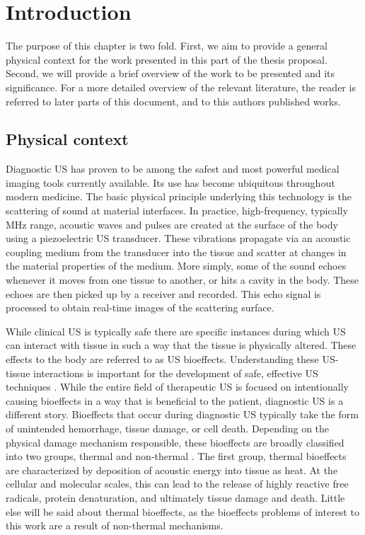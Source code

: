 \chapter{Introduction} \label{ch:usbe_intro}%
The purpose of this chapter is two fold. First, we aim to provide a
general physical context for the work presented in this part of the
thesis proposal. Second, we will provide a brief overview of the work
to be presented and its significance. For a more detailed overview of
the relevant literature, the reader is referred to later parts of this
document, and to this authors published works.

\section{Physical context} \label{sec:usbe_intro_physical_context}%
Diagnostic \ac{US} has proven to be among the safest and most powerful
medical imaging tools currently available. Its use has become
ubiquitous throughout modern medicine. The basic physical principle
underlying this technology is the scattering of sound at material
interfaces. In practice, high-frequency, typically MHz range, acoustic
waves and pulses are created at the surface of the body using a
piezoelectric \ac{US} transducer. These vibrations propagate via an
acoustic coupling medium from the transducer into the tissue and
scatter at changes in the material properties of the medium. More
simply, some of the sound echoes whenever it moves from one tissue to
another, or hits a cavity in the body. These echoes are then picked up
by a receiver and recorded. This echo signal is processed to obtain
real-time images of the scattering surface.

While clinical \ac{US} is typically safe there are specific instances
during which \ac{US} can interact with tissue in such a way that the
tissue is physically altered. These effects to the body are referred
to as \ac{US} bioeffects. Understanding these \ac{US}-tissue
interactions is important for the development of safe, effective
\ac{US} techniques \citep{Dalecki2004}. While the entire field of
therapeutic \ac{US} is focused on intentionally causing bioeffects in
a way that is beneficial to the patient, diagnostic \ac{US} is a
different story. Bioeffects that occur during diagnostic \ac{US}
typically take the form of unintended hemorrhage, tissue damage, or
cell death. Depending on the physical damage mechanism responsible,
these bioeffects are broadly classified into two groups, thermal and
non-thermal \citep{OBrien2007}. The first group, thermal bioeffects
are characterized by deposition of acoustic energy into tissue as
heat. At the cellular and molecular scales, this can lead to the
release of highly reactive free radicals, protein denaturation, and
ultimately tissue damage and death. Little else will be said about
thermal bioeffects, as the bioeffects problems of interest to this
work are a result of non-thermal mechanisms. 

